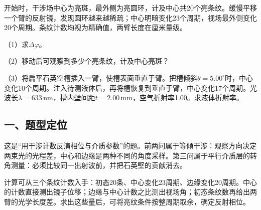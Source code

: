 \documentclass[12pt,a4paper,fontset=fandol]{ctexart}
\begin{document}
开始时，干涉场中心为亮斑，最外侧为亮圆环，计及中心共20个亮条纹。缓慢平移一个臂的反射镜，发现圆环越来越稀疏；中心明暗变化23个周期，视场最外侧变化20个周期。条纹计数均视为精确值，两臂长度在厘米量级。

（1）求\(\Delta\varphi\)。

（2）移动后可观察到多少个亮条纹，计及中心亮斑？

（3）将扁平石英空槽插入一臂，使槽表面垂直于臂。把槽倾斜\(\theta=5.00^\circ\)时，中心变化10个周期。注入待测液体后，再将槽恢复到垂直于臂，中心变化17个周期。光波长\(\lambda=633\,\mathrm{nm}\)，槽内壁间距\(t=2.00\,\mathrm{mm}\)，空气折射率1.00。求液体折射率。

\begin{center}
\begin{minipage}{\linewidth}
\centering\begingroup{}
\ifdim\wd\diagrambox>.88\linewidth
\sbox{\diagrambox}{\resizebox{.88\linewidth}{!}{\usebox{\diagrambox}}}\fi
\ifdim\ht\diagrambox>.38\textheight
\resizebox{!}{.38\textheight}{\usebox{\diagrambox}}
\else\usebox{\diagrambox}\fi
\par{}\endgroup\end{minipage}\end{center}

\subsection{一、题型定位}\label{ux4e00ux9898ux578bux5b9aux4f4d}

这是``用干涉计数反演相位与介质参数''的题。前两问属于等倾干涉：观察方向决定两束光的光程差，中心和边缘是两种不同的角度采样。第三问属于平行介质层的转角测量：必须比较同一出射波前，并把石英壁的贡献消去。

计算可从三个条纹计数入手：初态20条、中心变化23周期、边缘变化20周期。中心的计数直接测出镜子位移；边缘与中心计数之比测出视场角；初态条纹数再给出两臂的光学长度差。求出这些量后，可将亮纹条件按整周期取余，确定反射相位。
\end{document}
